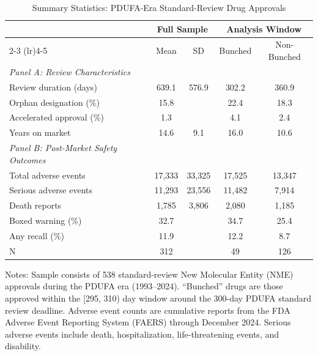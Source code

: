 \begin{table}[H]
\centering
\caption{Summary Statistics: PDUFA-Era Standard-Review Drug Approvals}
\begin{threeparttable}
\begin{tabular}{lcccc}
\toprule
 & \multicolumn{2}{c}{Full Sample} & \multicolumn{2}{c}{Analysis Window} \\
\cmidrule(lr){2-3} \cmidrule(lr){4-5}
 & Mean & SD & Bunched & Non-Bunched \\
\midrule
\emph{Panel A: Review Characteristics} & & & & \\
Review duration (days) & 639.1 & 576.9 & 302.2 & 360.9 \\
Orphan designation (\%) & 15.8 & & 22.4 & 18.3 \\
Accelerated approval (\%) & 1.3 & & 4.1 & 2.4 \\
Years on market & 14.6 & 9.1 & 16.0 & 10.6 \\
\addlinespace
\emph{Panel B: Post-Market Safety Outcomes} & & & & \\
Total adverse events & 17,333 & 33,325 & 17,525 & 13,347 \\
Serious adverse events & 11,293 & 23,556 & 11,482 & 7,914 \\
Death reports & 1,785 & 3,806 & 2,080 & 1,185 \\
Boxed warning (\%) & 32.7 & & 34.7 & 25.4 \\
Any recall (\%) & 11.9 & & 12.2 & 8.7 \\
\midrule
N & 312 & & 49 & 126 \\
\bottomrule
\end{tabular}
\begin{tablenotes}[flushleft]
\small
\item Notes: Sample consists of 538 standard-review New Molecular Entity (NME) approvals during the PDUFA era (1993--2024). ``Bunched'' drugs are those approved within the [295, 310) day window around the 300-day PDUFA standard review deadline. Adverse event counts are cumulative reports from the FDA Adverse Event Reporting System (FAERS) through December 2024. Serious adverse events include death, hospitalization, life-threatening events, and disability.
\end{tablenotes}
\end{threeparttable}
\label{tab:summary}
\end{table}
